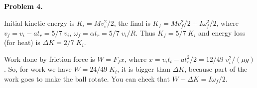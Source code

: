 \documentclass[12pt]{article}
\begin{document}
{\bf Problem 4.}

Initial kinetic energy is $K_i=M v_i^2/2$, the final is $K_f=M v_f^2/2 +I\omega_f^2/2$,
where $v_f=v_i-at_r=5/7\;v_i$, $\omega_f=\alpha t_r=5/7\;v_i/R$. Thus $K_f=5/7\;K_i$ and
energy loss (for heat) is $\Delta K=2/7\;K_i$.

Work done by friction force is $W=F_f x$, where $x=v_i t_t -a t_r^2/2=12/49\;v_i^2/(\mu g)$.
So, for work we have $W=24/49\;K_i$, it is  bigger than $\Delta K$, because part of the
work goes to make the ball rotate. You can check that $W-\Delta K=I\omega_f /2$.
\end{document}
